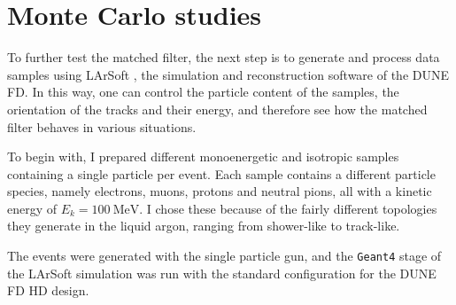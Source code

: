 \section{Monte Carlo studies}
\label{sec:matched_filter_mc_studies}

To further test the matched filter, the next step is to generate and process data samples using LArSoft \cite{Church2013}, the simulation and reconstruction software of the DUNE FD. In this way, one can control the particle content of the samples, the orientation of the tracks and their energy, and therefore see how the matched filter behaves in various situations.

To begin with, I prepared different monoenergetic and isotropic samples containing a single particle per event. Each sample contains a different particle species, namely electrons, muons, protons and neutral pions, all with a kinetic energy of $E_{k} = 100 \ \mathrm{MeV}$. I chose these because of the fairly different topologies they generate in the liquid argon, ranging from shower-like to track-like.

The events were generated with the single particle gun, and the \texttt{Geant4} stage of the LArSoft simulation was run with the standard configuration for the DUNE FD HD design.

